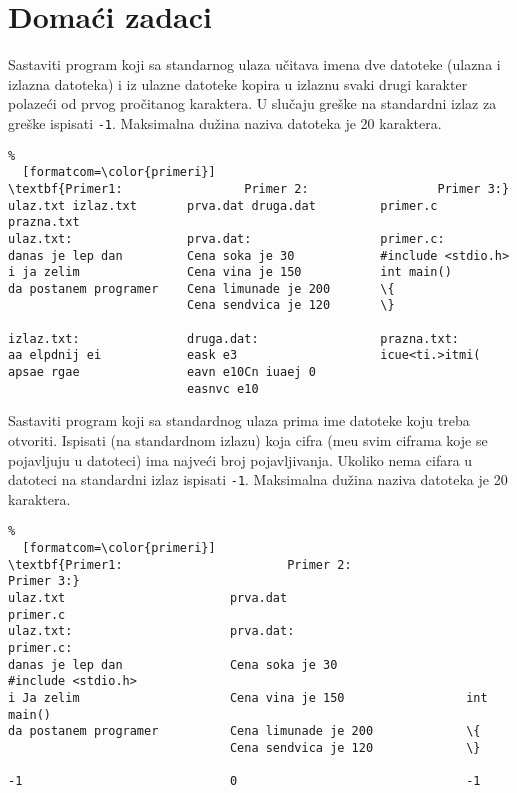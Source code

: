 \documentclass{article}
\def\d{{\fontencoding{T1}\selectfont\dj}}
\begin{document}
\newpage

\section{Domaći zadaci}
\begin{z}
Sastaviti program koji sa standarnog ulaza u\v citava imena dve
datoteke (ulazna i izlazna datoteka) i iz ulazne datoteke kopira u
izlaznu svaki drugi karakter polaze\'ci od prvog pro\v citanog
karaktera. U slučaju greške na standardni izlaz za greške ispisati {\tt -1}. 
 Maksimalna du\v zina naziva datoteka je 20 karaktera.
\end{z}
\begin{Verbatim}%
  [formatcom=\color{primeri}]
\textbf{Primer1:                 Primer 2:                  Primer 3:}
ulaz.txt izlaz.txt       prva.dat druga.dat         primer.c prazna.txt          
ulaz.txt:                prva.dat:                  primer.c:
danas je lep dan         Cena soka je 30            #include <stdio.h>
i ja zelim               Cena vina je 150           int main()
da postanem programer    Cena limunade je 200       \{
                         Cena sendvica je 120       \}

izlaz.txt:               druga.dat:                 prazna.txt:
aa elpdnij ei            eask e3                    icue<ti.>itmi(
apsae rgae               eavn e10Cn iuaej 0
                         easnvc e10 
\end{Verbatim}

\begin{z}
Sastaviti program koji sa standardnog ulaza prima ime datoteke koju treba
otvoriti. Ispisati (na standardnom
izlazu) koja cifra (me\d u svim ciframa koje se pojavljuju u datoteci)
ima najve\' ci broj pojavljivanja. Ukoliko nema cifara u datoteci na standardni izlaz ispisati {\tt -1}.
Maksimalna du\v zina naziva datoteka je 20 karaktera.
\end{z}
\begin{Verbatim}%
  [formatcom=\color{primeri}]
\textbf{Primer1:                       Primer 2:                        Primer 3:}
ulaz.txt                       prva.dat                         primer.c        
ulaz.txt:                      prva.dat:                        primer.c:
danas je lep dan               Cena soka je 30                  #include <stdio.h>
i Ja zelim                     Cena vina je 150                 int main()
da postanem programer          Cena limunade je 200             \{
                               Cena sendvica je 120             \}
                               
-1                             0                                -1
\end{Verbatim}  
\end{document}
